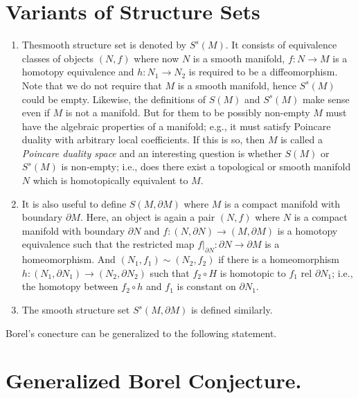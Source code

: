 \section{Variants of Structure Sets}\label{c2:sec2.2}

\begin{enumerate}[(1)]
\item The\pageoriginale smooth structure set is denoted by $S^s(M)$. It consists of
  equivalence classes of objects $(N, f)$ where now $N$ is a smooth
  manifold, $f: N\to M$ is a homotopy equivalence and $h: N_1 \to N_2$
  is required to be a diffeomorphism. Note that we do not require that
  $M$ is a smooth manifold, hence $S^s(M)$ could be empty. Likewise,
  the definitions of $S(M)$ and $S^s (M)$ make sense even if $M$ is
  not a manifold. But for them to be possibly non-empty $M$ must have
  the algebraic properties of a manifold; e.g., it must satisfy
  Poincare duality with arbitrary local coefficients. If this is so,
  then $M$ is called a \textit{Poincare duality space} and an
  interesting question is whether $S(M)$ or $S^s(M)$ is non-empty;
  i.e., does there exist a topological or smooth manifold $N$ which is
  homotopically  equivalent to $M$.

  \item It is also useful to define $S(M, \partial M)$ where $M$ is a
    compact manifold with boundary $\partial M$. Here, an object is
    again a pair $(N, f)$ where $N$ is a compact manifold with
    boundary $\partial N$ and $f: (N, \partial N) \to (M, \partial M)$
    is a homotopy equivalence such that the restricted map
    $f|_{\partial N}: \partial N \to \partial M$ is a
    homeomorphism. And $(N_1, f_1)\sim (N_2, f_2)$ if there is a
    homeomorphism $h: (N_1, \partial N_1) \to (N_2, \partial N_2)$
    such that $f_2\circ H$  is homotopic to $f_1$ rel $\partial N_1$;
    i.e.,  the homotopy between $f_2 \circ h$ and $f_1$ is constant on
    $\partial N_1$.

  \item The smooth structure set $S^s (M, \partial M)$ is defined
    similarly. 
\end{enumerate}

Borel's conecture can be generalized to the following statement.

\section{Generalized Borel Conjecture.}\label{c2:sec2.3}

